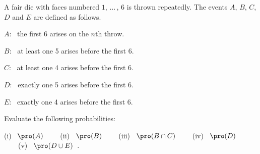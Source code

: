 \begin{problem}[STEP I 2015 Q13]
A fair die with faces numbered $1$, $\ldots\,$, $6$ is thrown repeatedly. The events $A$,  $B$, $C$, $D$ and $E$ are defined as follows.
\ben
\item []$A$: \ the first 6 arises on the $n$th throw.
\item []$B$: \ at least one 5 arises before the first 6.
\item []$C$: \ at least one 4 arises before the first 6.
\item []$D$: \ exactly one 5 arises before the first 6.
\item []$E$: \ exactly one 4 arises before the first 6.
\een

Evaluate the following probabilities:

(i) \  $\pro(A)$ \ \  \ \
(ii) \  $\pro(B)$ \ \ \ \
(iii) \ $\pro(B\cap C)$ \ \ \ \
(iv) \ $\pro(D)$ \ \ \ \
(v)  \ $\pro(D\cup E)$ \,.
\end{problem}


